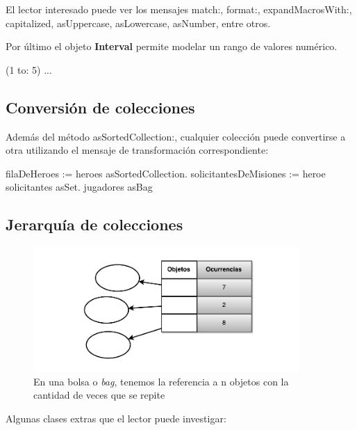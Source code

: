 \documentclass[a4paper,12pt]{book}
\begin{document}
El lector interesado puede ver los mensajes match:, format:, expandMacrosWith:, capitalized, asUppercase,
asLowercase, asNumber, entre otros.

Por último el objeto \textbf{Interval} permite modelar un rango de valores numérico.

\begin{code}
(1 to: 5) ...
\end{code}

\subsection{Conversión de colecciones}

Además del método asSortedCollection:, cualquier colección puede convertirse a otra utilizando el mensaje
de transformación correspondiente:

\begin{code}
filaDeHeroes := heroes asSortedCollection.
solicitantesDeMisiones := heroe solicitantes asSet.
jugadores asBag
\end{code}

\subsection{Jerarquía de colecciones}

\begin{figure}[h!]
    \centering
    \includegraphics[width=0.9\textwidth]{images/40_Bag.pdf}
    \caption{En una bolsa o \textit{bag}, tenemos la referencia a n objetos con la cantidad de veces que se repite}
\end{figure}
\FloatBarrier

Algunas clases extras que el lector puede investigar:
\end{document}
